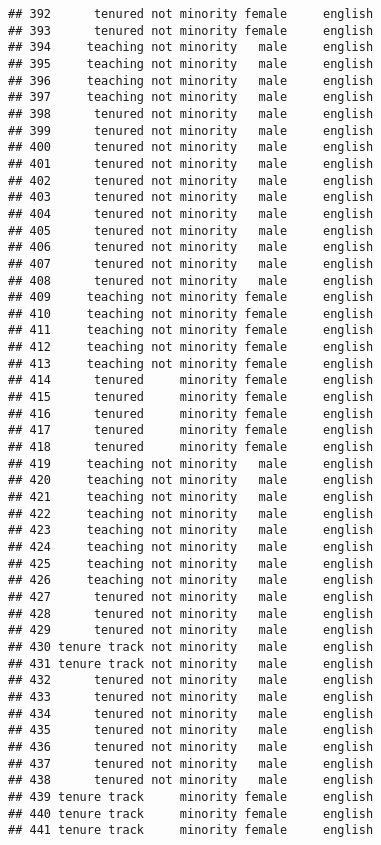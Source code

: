 \documentclass[
]{article}
\begin{document}
\begin{verbatim}
## 392      tenured not minority female     english
## 393      tenured not minority female     english
## 394     teaching not minority   male     english
## 395     teaching not minority   male     english
## 396     teaching not minority   male     english
## 397     teaching not minority   male     english
## 398      tenured not minority   male     english
## 399      tenured not minority   male     english
## 400      tenured not minority   male     english
## 401      tenured not minority   male     english
## 402      tenured not minority   male     english
## 403      tenured not minority   male     english
## 404      tenured not minority   male     english
## 405      tenured not minority   male     english
## 406      tenured not minority   male     english
## 407      tenured not minority   male     english
## 408      tenured not minority   male     english
## 409     teaching not minority female     english
## 410     teaching not minority female     english
## 411     teaching not minority female     english
## 412     teaching not minority female     english
## 413     teaching not minority female     english
## 414      tenured     minority female     english
## 415      tenured     minority female     english
## 416      tenured     minority female     english
## 417      tenured     minority female     english
## 418      tenured     minority female     english
## 419     teaching not minority   male     english
## 420     teaching not minority   male     english
## 421     teaching not minority   male     english
## 422     teaching not minority   male     english
## 423     teaching not minority   male     english
## 424     teaching not minority   male     english
## 425     teaching not minority   male     english
## 426     teaching not minority   male     english
## 427      tenured not minority   male     english
## 428      tenured not minority   male     english
## 429      tenured not minority   male     english
## 430 tenure track not minority   male     english
## 431 tenure track not minority   male     english
## 432      tenured not minority   male     english
## 433      tenured not minority   male     english
## 434      tenured not minority   male     english
## 435      tenured not minority   male     english
## 436      tenured not minority   male     english
## 437      tenured not minority   male     english
## 438      tenured not minority   male     english
## 439 tenure track     minority female     english
## 440 tenure track     minority female     english
## 441 tenure track     minority female     english

\end{verbatim}
\end{document}

